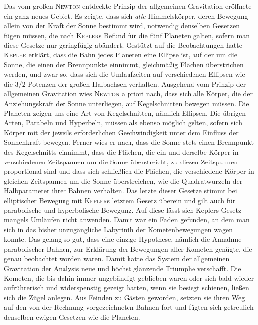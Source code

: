 Das vom großen \textsc{Newton} entdeckte Prinzip der allgemeinen Gravitation eröffnete ein ganz neues Gebiet. Es zeigte, dass sich \emph{alle} Himmelskörper, deren Bewegung allein von der Kraft der Sonne bestimmt wird, notwendig
denselben Gesetzen fügen müssen, die nach \textsc{Kepler}s Befund für die fünf Planeten galten, sofern man diese Gesetze nur geringfügig abändert. Gestützt auf die Beobachtungen hatte \textsc{Kepler} erklärt, dass die Bahn jedes Planeten eine Ellipse ist, auf der um die Sonne, die einen der Brennpunkte einnimmt, gleichmäßig Flächen überstrichen werden, und zwar so, dass sich die Umlaufzeiten auf verschiedenen Ellipsen wie die \(3/2\)-Potenzen der großen Halbachsen verhalten. Ausgehend vom Prinzip der allgemeinen Gravitation wies \textsc{Newton} a priori nach, dass sich alle Körper, die der Anziehungskraft der Sonne unterliegen, auf Kegelschnitten bewegen müssen. Die Planeten zeigen uns eine Art von Kegelschnitten, nämlich Ellipsen. Die übrigen Arten, Parabeln und Hyperbeln, müssen als ebenso möglich gelten, sofern sich Körper mit der jeweils erforderlichen Geschwindigkeit unter dem Einfluss der Sonnenkraft bewegen. Ferner wies er nach, dass die Sonne stets einen Brennpunkt des Kegelschnitts einnimmt, dass die Flächen, die ein und derselbe Körper in verschiedenen Zeitspannen um die Sonne überstreicht, zu diesen Zeitspannen proportional sind und dass sich schließlich die Flächen, die verschiedene Körper in gleichen Zeitspannen um die Sonne überstreichen, wie die Quadratwurzeln der Halbparameter ihrer Bahnen verhalten. Das letzte dieser Gesetze stimmt bei elliptischer Bewegung mit \textsc{Kepler}s letztem Gesetz überein und gilt auch für parabolische und hyperbolische Bewegung. Auf diese lässt sich Keplers Gesetz mangels Umläufen nicht anwenden. Damit war ein Faden gefunden, an dem man sich in das bisher unzugängliche Labyrinth der Kometenbewegungen wagen konnte. Das gelang so gut, dass eine einzige Hypothese, nämlich die Annahme parabolischer Bahnen, zur Erklärung der Bewegungen aller Kometen genügte, die genau beobachtet worden waren. Damit hatte das System der allgemeinen Gravitation der Analysis neue und höchst glänzende Triumphe verschafft. Die Kometen, die bis dahin immer ungebändigt geblieben waren oder sich bald wieder aufrührerisch und widerspenstig gezeigt hatten, wenn sie besiegt schienen, ließen sich die Zügel anlegen. Aus Feinden zu Gästen geworden, setzten sie ihren Weg auf den von der Rechnung vorgezeichneten Bahnen fort und fügten sich getreulich denselben ewigen Gesetzen wie die Planeten.

